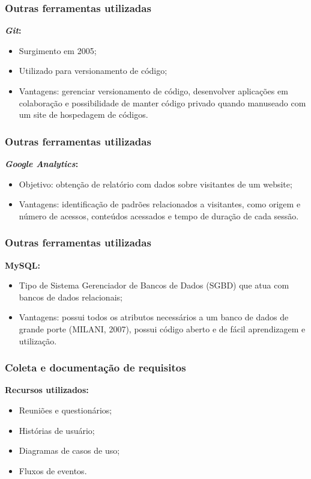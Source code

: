 \documentclass{beamer}
\begin{document}
\begin{frame}
    \frametitle{Outras ferramentas utilizadas}
    \textbf{\textit{Git}:} 
    \begin{itemize}
        \item Surgimento em 2005;
        \item Utilizado para versionamento de código; %
        \item Vantagens: gerenciar versionamento de código, desenvolver aplicações em colaboração e possibilidade de manter código privado quando manuseado com um site de hospedagem de códigos.
    \end{itemize}
\end{frame}


\begin{frame}
    \frametitle{Outras ferramentas utilizadas}
    \textbf{\textit{Google Analytics}:} 
    \begin{itemize}
        \item Objetivo: obtenção de relatório com dados sobre visitantes de um website;
        \item Vantagens: identificação de padrões relacionados a visitantes, como origem e número de acessos, conteúdos acessados e tempo de duração de cada sessão. %
    \end{itemize}
\end{frame}


\begin{frame}
    \frametitle{Outras ferramentas utilizadas}
    \textbf{MySQL:} 
    \begin{itemize}
        \item Tipo de Sistema Gerenciador de Bancos de Dados (SGBD) que atua com bancos de dados relacionais; %
        \item Vantagens: possui todos os atributos necessários a um banco de dados de grande porte (MILANI, 2007), possui código aberto e de fácil aprendizagem e utilização. 
    \end{itemize}
    
\end{frame}



\begin{frame}
    \frametitle{Coleta e documentação de requisitos}
    \textbf{Recursos utilizados:}
    \begin{itemize}
        \item Reuniões e questionários;
        \item Histórias de usuário;
        \item Diagramas de casos de uso;
        \item Fluxos de eventos.
    \end{itemize}
\end{frame}
\end{document}
